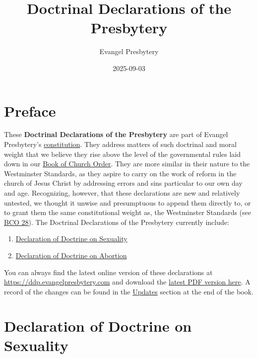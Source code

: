 \documentclass[
]{book}
\title{Doctrinal Declarations of the Presbytery}
\author{Evangel Presbytery}
\date{2025-09-03}
\begin{document}
\maketitle



{
\hypersetup{linkcolor=}
\setcounter{tocdepth}{1}
\tableofcontents
}
\hypertarget{preface}{%
\chapter*{Preface}\label{preface}}

These \textbf{Doctrinal Declarations of the Presbytery} are part of Evangel Presbytery's \href{https://bco.evangelpresbytery.com/preface.html\#c.-constitution-defined}{constitution}. They address matters of such doctrinal and moral weight that we believe they rise above the level of the governmental rules laid down in our \href{https://bco.evangelpresbytery.com/}{Book of Church Order}. They are more similar in their nature to the Westminster Standards, as they aspire to carry on the work of reform in the church of Jesus Christ by addressing errors and sins particular to our own day and age. Recognizing, however, that these declarations are new and relatively untested, we thought it unwise and presumptuous to append them directly to, or to grant them the same constitutional weight as, the Westminster Standards (see \href{https://bco.evangelpresbytery.com/form-of-government.html\#amending-the-constitution-of-the-church}{BCO 28}). The Doctrinal Declarations of the Presbytery currently include:

\begin{enumerate}
\def\labelenumi{\arabic{enumi}.}
\item
  \protect\hyperlink{declaration-of-doctrine-on-sexuality}{Declaration of Doctrine on Sexuality}
\item
  \protect\hyperlink{declaration-of-doctrine-on-abortion}{Declaration of Doctrine on Abortion}
\end{enumerate}

You can always find the latest online version of these declarations at \url{https://ddp.evangelpresbytery.com} and download the \href{https://ddp.evangelpresbytery.com/evangel-presbytery-ddp.pdf}{latest PDF version here}. A record of the changes can be found in the \href{https://ddp.evangelpresbytery.com/updates.html}{Updates} section at the end of the book.

\mainmatter

\hypertarget{declaration-of-doctrine-on-sexuality}{%
\chapter*{Declaration of Doctrine on Sexuality}\label{declaration-of-doctrine-on-sexuality}}
\end{document}
